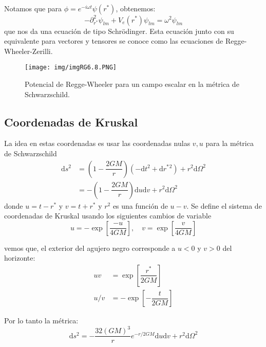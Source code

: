 \documentclass[../main]{subfiles}
\begin{document}
Notamos que para $\phi=e^{-i\omega t}\psi(r^*)$, obtenemos:
\begin{equation}
    -\partial^2_{r^*}\psi_{lm}+V_e(r^*)\psi_{lm}=\omega^2 \psi_{lm}
\end{equation}
que nos da una ecuación de tipo Schrödinger. Esta ecuación junto con su equivalente para vectores y tensores se conoce como las ecuaciones de Regge-Wheeler-Zerilli.
\begin{figure}[h]
    \centering
    \texttt{[image: img/imgRG6.8.PNG]}
    \caption{Potencial de Regge-Wheeler para un campo escalar en la métrica de Schwarzschild.}
\end{figure}

\subsection{Coordenadas de Kruskal}

La idea en estas coordenadas es usar las coordenadas nulas $v, u$ para la métrica de Schwarzschild
\begin{equation}
    \begin{split}
        \mathrm{d}s^2&=\left(1-\dfrac{2GM}{r}\right)(-\mathrm{d}t^2+\mathrm{d}r^*{}^2)+r^2\mathrm{d}\Omega^2\\
        &=-\left(1-\dfrac{2GM}{r}\right)\mathrm{d}u\mathrm{d}v+r^2\mathrm{d}\Omega^2
    \end{split}
\end{equation}
donde $u=t-r^*$ y $v=t+r^*$ y $r^2$ es una función de $u-v$. Se define el sistema de coordenadas de Kruskal usando los siguientes cambios de variable
\begin{equation}
    u=-\exp\left[\dfrac{-u}{4GM}\right],\quad v=\exp\left[\dfrac{v}{4GM}\right]
\end{equation}

vemos que, el exterior del agujero negro corresponde a $u<0$ y $v>0$ del horizonte:
\begin{equation}
    \begin{split}
        uv&=\exp\left[\dfrac{r^*}{2GM}\right]\\
        u/v&=-\exp\left[-\dfrac{t}{2GM}\right]
    \end{split}
\end{equation}

Por lo tanto la métrica:
\begin{equation}
    \mathrm{d}s^2=-\dfrac{32(GM)^3}{r}e^{-r/2GM}\mathrm{d}u\mathrm{d}v+r^2\mathrm{d}\Omega^2
\end{equation}
\end{document}
